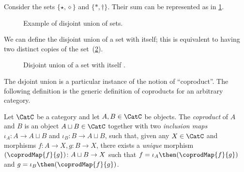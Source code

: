 \begin{example}
Consider the sets $\{\star, \diamond\}$ and $\{\ast, \dagger\}$. Their sum can be represented as in \cref{fig:disjoint}.
\begin{figure}[h!]
    \begin{center}
    \end{center}
    \caption{Example of disjoint union of sets. \label{fig:disjoint}}
\end{figure}
\end{example}


We can define the disjoint union of a set with itself; this is equivalent
to having two distinct copies of the set~(\cref{fig:disjointself}).

\begin{figure}[h!]
\begin{center}
    \caption{Disjoint union of a set with itself \label{fig:disjointself}.}
\end{center}
\end{figure}

The dsjoint union is a particular instance of the notion of ``coproduct''.
The following definition is the generic definition of coproducts for an arbitrary category.

\begin{shaded}
\begin{definition}[Coproduct]
Let $\CatC$ be a category and let $A, B \in \CatC$ be objects. The \emph{coproduct} of $A$ and $B$ is an object $A \sqcup B \in \CatC$ together with two \emph{inclusion maps} $\iota_A \colon A \to A \sqcup B $ and $\iota_B \colon B \to A  \sqcup B $, such that, given any $X \in \CatC$ and morphisms $f\colon  A \to X, g \colon B \to X$, there exists a \emph{unique} morphism $(\coprodMap{f}{g}) \colon A \sqcup B \to X$ such that $f = \iota_A\then (\coprodMap{f}{g})$ and $g = \iota_B \then (\coprodMap{f}{g})$.
\end{definition}
\end{shaded}

